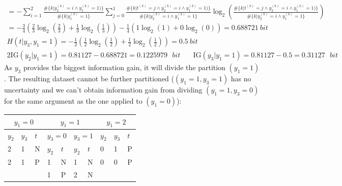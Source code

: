\documentclass{exam}
\begin{document}
\begin{questions}
\begin{gather*}
                = - \sum_{i = 1}^{2}  \frac{\#\{k|y_2^{(k)} = i \wedge y_1^{(k)} = 1)\}}{\#\{k|y_1^{(k)} = 1\}} \sum_{j = 0}^{1}  \frac{\#\{k|t^{(k)} = j \wedge y_2^{(k)} = i \wedge y_1^{(k) } = 1)\}}{\#\{k|y_2^{(k)} = i \wedge y_1^{(k)} = 1\}} \log_2\left(\frac{\#\{k|t^{(k)} = j \wedge y_2^{(k)} = i \wedge y_1^{(k) } = 1)\}}{\#\{k|y_2^{(k)} = i \wedge y_1^{(k)} = 1\}}\right) \\
                = - \frac{3}{4}\left( \frac{2}{3}\log_2\left(\frac{2}{3}\right) + \frac{1}{3}\log_2\left(\frac{1}{3}\right)\right) - \frac{1}{4} \left( 1\log_2(1) + 0\log_2(0)\right) 
                = 0.688721 \medspace bit\\
            H(t|y_3, y_1 = 1)
                = - \frac{1}{2}\left( \frac{1}{2}\log_2\left(\frac{1}{2}\right) + \frac{1}{2}\log_2\left(\frac{1}{2}\right)\right)
                =  0.5 \medspace bit
        \end{gather*}
        \vspace{-1.5em}
        \begin{alignat*}{2}
            \text{IG}(y_2|y_1 = 1) = 0.81127 - 0.688721  = 0.1225979 \text{ }bit \quad & \text{IG}(y_3|y_1 = 1) = 0.81127 - 0.5  = 0.31127 \text{ }bit 
        \end{alignat*}
        As $y_3$ provides the biggest information gain, it will divide the partition $(y_1 = 1)$. The resulting dataset cannot be further partitioned ($(y_1 = 1, y_3 = 1)$ has no uncertainty and we can't obtain information gain from dividing $(y_1 = 1, y_3 = 0)$ for the same argument as the one applied to $(y_1 = 0)$):
        \begin{table}[H]
            \centering
            \begin{tabular}{lll|ll|ll|lll}
            \multicolumn{3}{c|}{$y_1  = 0$} & \multicolumn{4}{c|}{$y_1 = 1$}                                  & \multicolumn{3}{c}{$y_1 = 2$} \\ \hline
            $y_2$     & $y_3$     & $t$     & \multicolumn{2}{l|}{$y_3 = 0$} & \multicolumn{2}{l|}{$y_3 = 1$} & $y_2$     & $y_3$     & $t$    \\ \hline
            2         & 1         & N       & $y_2$           & $t$          & $y_2$           & $t$          & 0         & 1         & P      \\ \cline{4-7}
            2         & 1         & P       & 1               & N            & 1               & N            & 0         & 0         & P      \\
                      &           &         & 1               & P            & 2               & N            &           &           &       

\end{tabular}
\end{table}
\end{questions}
\end{document}
